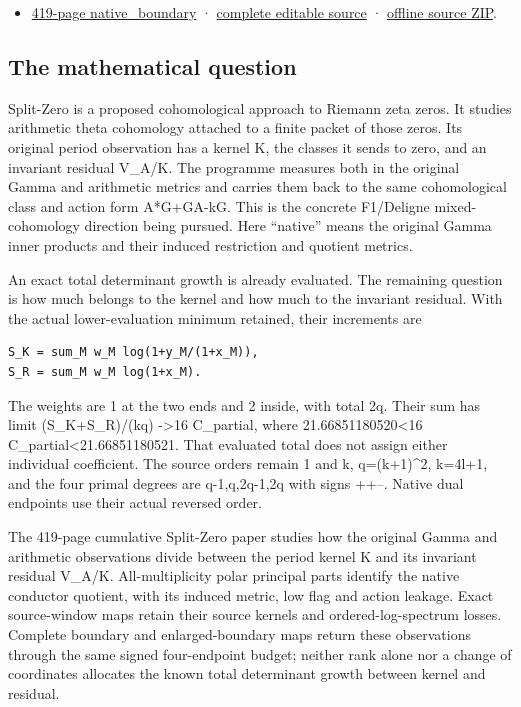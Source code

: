 \documentclass[
]{article}
\providecommand{\tightlist}{%
  \setlength{\itemsep}{0pt}\setlength{\parskip}{0pt}}
\begin{document}
\begin{itemize}
\tightlist
\item
  \href{https://zenodo.org/api/records/22771246/files/69-native-boundary-reader.pdf/content}{419-page
  native\_boundary} ·
  \href{https://github.com/KokunoYumeto/zeta-function-research-reader/tree/0512b18d5479f3abc24ae654f8ffee4e5d53922e/workbenches/splitzero-tandem/continuations/20260915-native-boundary-continuation}{complete
  editable source} ·
  \href{https://zenodo.org/api/records/22771246/files/70-native-boundary-sources.zip/content}{offline
  source ZIP}.
\end{itemize}

\subsection{The mathematical question}\label{the-mathematical-question}

Split-Zero is a proposed cohomological approach to Riemann zeta zeros.
It studies arithmetic theta cohomology attached to a finite packet of
those zeros. Its original period observation has a kernel K, the classes
it sends to zero, and an invariant residual V\_A/K. The programme
measures both in the original Gamma and arithmetic metrics and carries
them back to the same cohomological class and action form A*G+GA-kG.
This is the concrete F1/Deligne mixed-cohomology direction being
pursued. Here ``native'' means the original Gamma inner products and
their induced restriction and quotient metrics.

An exact total determinant growth is already evaluated. The remaining
question is how much belongs to the kernel and how much to the invariant
residual. With the actual lower-evaluation minimum retained, their
increments are

\begin{verbatim}
S_K = sum_M w_M log(1+y_M/(1+x_M)),
S_R = sum_M w_M log(1+x_M).
\end{verbatim}

The weights are 1 at the two ends and 2 inside, with total 2q. Their sum
has limit (S\_K+S\_R)/(kq) -\textgreater16 C\_partial, where
21.66851180520\textless16 C\_partial\textless21.66851180521. That
evaluated total does not assign either individual coefficient. The
source orders remain 1 and k, q=(k+1)\^{}2, k=4l+1, and the four primal
degrees are q-1,q,2q-1,2q with signs ++--. Native dual endpoints use
their actual reversed order.

The 419-page cumulative Split-Zero paper studies how the original Gamma
and arithmetic observations divide between the period kernel K and its
invariant residual V\_A/K. All-multiplicity polar principal parts
identify the native conductor quotient, with its induced metric, low
flag and action leakage. Exact source-window maps retain their source
kernels and ordered-log-spectrum losses. Complete boundary and
enlarged-boundary maps return these observations through the same signed
four-endpoint budget; neither rank alone nor a change of coordinates
allocates the known total determinant growth between kernel and
residual.
\end{document}
